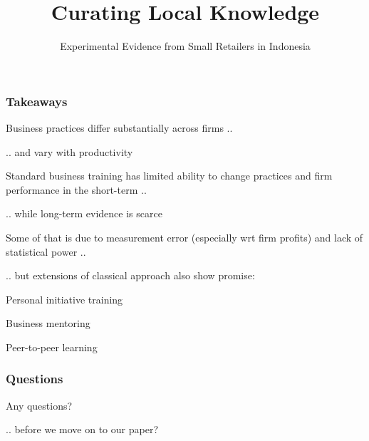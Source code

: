 \documentclass[hideothersubsections, usenames,dvipsnames,11pt]{beamer}
\newenvironment{itemize_2pt}{\itemize\addtolength{\itemsep}{2pt}}{\enditemize}
\begin{document}
\begin{frame}
\frametitle{Takeaways}
	\begin{itemize_2pt}
    \item \textcolor{bdf}{Business practices differ substantially across firms} ..
    \item[] \quad .. and vary with productivity
    \item \textcolor{bdf}{Standard business training has limited ability} to change practices and firm performance in the short-term ..
    \item[] \quad .. while long-term evidence is scarce
    \item Some of that is due to \textcolor{bdf}{measurement error} (especially wrt firm profits) and \textcolor{bdf}{lack of statistical power} ..
    \item[] \quad .. but \textcolor{bdf}{extensions of classical approach} also show promise:
    
\vspace{0.5em}    
    
    \begin{itemize_2pt}
    	\item Personal initiative training
    	\item Business mentoring
    	\item Peer-to-peer learning
    \end{itemize_2pt}
   	\vspace{0.10in}
\end{itemize_2pt}
\end{frame}

\begin{frame}
\frametitle{Questions}
	\textcolor{bdf}{Any questions?}
	\begin{itemize_2pt}
	\item[] .. before we move on to our paper?
	\end{itemize_2pt}
\end{frame}




\title[]{Curating Local Knowledge}
\subtitle{Experimental Evidence from Small Retailers in Indonesia}
\end{document}
